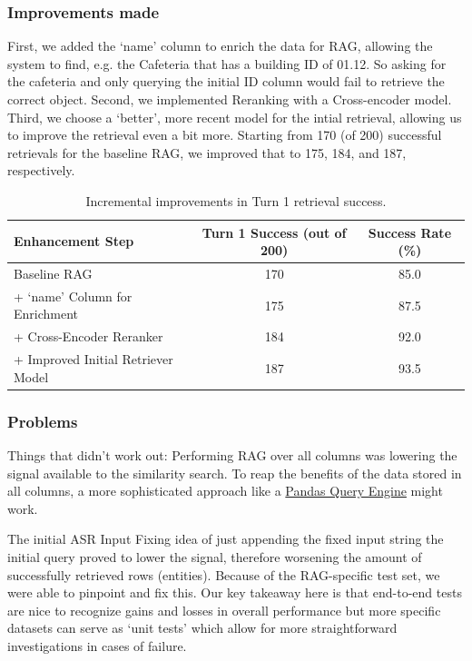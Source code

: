 \documentclass{article}
\begin{document}
\subsubsection*{Improvements made}

First, we added the `name' column to enrich the data for RAG, allowing the system to find, e.g. the Cafeteria that has a building ID of 01.12. So asking for the cafeteria and only querying the initial ID column would fail to retrieve the correct object. Second, we implemented Reranking with a Cross-encoder model. Third, we choose a `better', more recent model for the intial retrieval, allowing us to improve the retrieval even a bit more. Starting from 170 (of 200) successful retrievals for the baseline RAG, we improved that to 175, 184, and 187, respectively.

\begin{table}[H]
\centering
\begin{tabular}{|l|c|c|}
\hline
\textbf{Enhancement Step} & \textbf{Turn 1 Success (out of 200)} & \textbf{Success Rate (\%)} \\
\hline
Baseline RAG & 170 & 85.0 \\
+ `name' Column for Enrichment & 175 & 87.5 \\
+ Cross-Encoder Reranker & 184 & 92.0\\
+ Improved Initial Retriever Model & 187 & 93.5 \\
\hline
\end{tabular}
\caption{Incremental improvements in Turn 1 retrieval success.}
\end{table}

\subsubsection*{Problems}

Things that didn't work out: Performing RAG over all columns was lowering the signal available to the similarity search. To reap the benefits of the data stored in all columns, a more sophisticated approach like a \href{https://docs.llamaindex.ai/en/stable/examples/query_engine/pandas_query_engine/}{Pandas Query Engine} might work.

The initial ASR Input Fixing idea of just appending the fixed input string the initial query proved to lower the signal, therefore worsening the amount of successfully retrieved rows (entities). Because of the RAG-specific test set, we were able to pinpoint and fix this. Our key takeaway here is that end-to-end tests are nice to recognize gains and losses in overall performance but more specific datasets can serve as `unit tests' which allow for more straightforward investigations in cases of failure.
\end{document}
